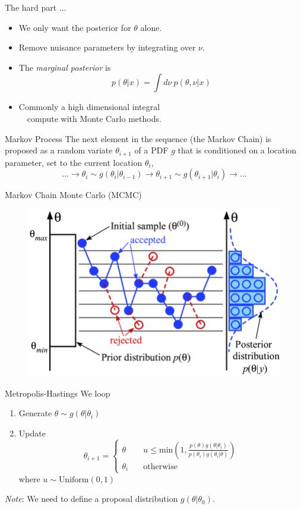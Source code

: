 \documentclass[
aspectratio=169,
14pt,
professionalfonts
]{beamer}
\newcommand{\arrow}{~\ding{220}~}
\begin{document}
\begin{frame}{The hard part ...}
\begin{itemize}
    \item We only want the posterior for $\theta$ alone.
    \item Remove nuisance parameters by integrating over $\nu$.
    \item[\arrow] The \textit{marginal posterior} is
        $$
        p(\theta | x) = \int d\nu ~ p(\theta, \nu | x)
        $$
    \item Commonly a high dimensional integral\\ \arrow compute with Monte Carlo methods.
\end{itemize}
\end{frame}

\begin{frame}{Markov Process}
    The next element in the sequence (the Markov Chain) is proposed as a random variate $\theta_{i + 1}$ of a PDF $g$ that is conditioned on a location parameter, set to the current location $\theta_i$,
    $$
    \ldots \to \theta_{i} \sim g(\theta_{i} | \theta_{i-1}) \to \theta_{i+1} \sim g(\theta_{i+1} | \theta_{i}) \to \ldots
    $$
\end{frame}

\begin{frame}{Markov Chain Monte Carlo (MCMC)}
    \begin{figure}
        \centering
        \includegraphics[width=0.6\linewidth]{../plots/mcmc_diagram.png}
    \end{figure}
\end{frame}

\begin{frame}{Metropolis-Hastings}
We loop
\begin{enumerate}
    \item Generate $\theta \sim g(\theta|\theta_i)$
    \item Update
    \begin{equation*}
        \theta_{i+1} =
        \begin{cases}
            \theta  &\quad u \leq \text{min}\left(1, \frac{p(\theta)g(\theta|\theta_i)}{p(\theta_i)g(\theta_i|\theta)}\right)\\
            \theta_i &\quad \text{otherwise}
        \end{cases}
    \end{equation*}
    where $u \sim \text{Uniform}(0, 1)$
\end{enumerate}
\textit{Note}: We need to define a proposal distribution $g(\theta|\theta_0)$.
\end{frame}
\end{document}
